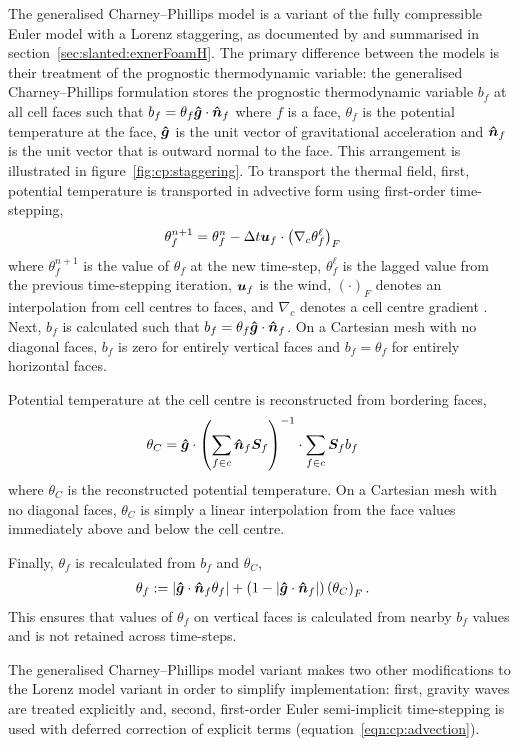 The generalised Charney--Phillips model is a variant of the fully compressible Euler model with a Lorenz staggering, as documented by \citet{weller-shahrokhi2014} and summarised in section~\ref{sec:slanted:exnerFoamH}.
The primary difference between the models is their treatment of the prognostic thermodynamic variable: the generalised Charney--Phillips formulation stores the prognostic thermodynamic variable $b_f$ at all cell faces such that $b_f = \theta_f \bm{\hat{g}} \cdot \bm{\hat{n}}_f$ where $f$ is a face, $\theta_f$ is the potential temperature at the face, $\bm{\hat{g}}$ is the unit vector of gravitational acceleration and $\bm{\hat{n}}_f$ is the unit vector that is outward normal to the face.
This arrangement is illustrated in figure~\ref{fig:cp:staggering}.
To transport the thermal field, first, potential temperature is transported in advective form using first-order time-stepping,
\begin{align}
	\theta_f^{n+1} &= \theta_f^n - \Delta t \bm{u}_f \cdot \left( \nabla_c \theta_f^{\ell} \right)_F \label{eqn:cp:advection}
\end{align}
where $\theta_f^{n+1}$ is the value of $\theta_f$ at the new time-step, $\theta_f^\ell$ is the lagged value from the previous time-stepping iteration, $\bm{u}_f$ is the wind, $\left( \cdot \right)_F$ denotes an interpolation from cell centres to faces, and $\nabla_c$ denotes a cell centre gradient \citep{weller-shahrokhi2014}.
Next, $b_f$ is calculated such that $b_f = \theta_f \bm{\hat{g}} \cdot \bm{\hat{n}}_f$.  
On a Cartesian mesh with no diagonal faces, $b_f$ is zero for entirely vertical faces and $b_f = \theta_f$ for entirely horizontal faces.

Potential temperature at the cell centre is reconstructed from bordering faces,
\begin{align}
	\theta_C &= \bm{\hat{g}} \cdot \left( \sum_{f \in c} \bm{\hat{n}}_f \bm{S}_f \right)^{-1} \cdot \sum_{f \in c} \bm{S}_f b_f \label{eqn:cp:reconstruct}
\end{align}
where $\theta_C$ is the reconstructed potential temperature.  On a Cartesian mesh with no diagonal faces, $\theta_C$ is simply a linear interpolation from the face values immediately above and below the cell centre.

Finally, $\theta_f$ is recalculated from $b_f$ and $\theta_C$,
\begin{align}
	\theta_f &:= \left\lvert  \bm{\hat{g}} \cdot \bm{\hat{n}}_f \theta_f \right\rvert + \left( 1 - \left\lvert \bm{\hat{g}} \cdot \bm{\hat{n}}_f  \right\rvert \right) \left( \theta_C \right)_F \text{.}
\end{align}
This ensures that values of $\theta_f$ on vertical faces is calculated from nearby $b_f$ values and is not retained across time-steps.

The generalised Charney--Phillips model variant makes two other modifications to the Lorenz model variant in order to simplify implementation: first, gravity waves are treated explicitly and, second, first-order Euler semi-implicit time-stepping is used with deferred correction of explicit terms (equation~\ref{eqn:cp:advection}).

